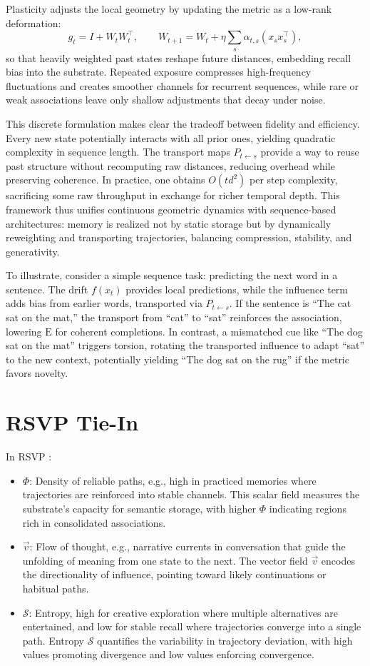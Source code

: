 \documentclass[a4paper,12pt]{article}
\newcommand{\E}{\mathrm{E}}
\newcommand{\Scal}{\mathcal{S}}
\newcommand{\vvec}{\vec{v}}
\begin{document}
Plasticity adjusts the local geometry by updating the metric as a low-rank deformation:
\[
g_t = I + W_t W_t^\top, \qquad W_{t+1} = W_t + \eta \sum_s \alpha_{t,s} (x_s x_s^\top),
\]
so that heavily weighted past states reshape future distances, embedding recall bias into the substrate. Repeated exposure compresses high-frequency fluctuations and creates smoother channels for recurrent sequences, while rare or weak associations leave only shallow adjustments that decay under noise.

This discrete formulation makes clear the tradeoff between fidelity and efficiency. Every new state potentially interacts with all prior ones, yielding quadratic complexity in sequence length. The transport maps $P_{t \leftarrow s}$ provide a way to reuse past structure without recomputing raw distances, reducing overhead while preserving coherence. In practice, one obtains $O(t d^2)$ per step complexity, sacrificing some raw throughput in exchange for richer temporal depth. This framework thus unifies continuous geometric dynamics with sequence-based architectures: memory is realized not by static storage but by dynamically reweighting and transporting trajectories, balancing compression, stability, and generativity.

To illustrate, consider a simple sequence task: predicting the next word in a sentence. The drift $f(x_t)$ provides local predictions, while the influence term adds bias from earlier words, transported via $P_{t \leftarrow s}$. If the sentence is ``The cat sat on the mat,'' the transport from ``cat'' to ``sat'' reinforces the association, lowering $\E$ for coherent completions. In contrast, a mismatched cue like ``The dog sat on the mat'' triggers torsion, rotating the transported influence to adapt ``sat'' to the new context, potentially yielding ``The dog sat on the rug'' if the metric favors novelty.

\section{RSVP Tie-In}
In RSVP \citep{semantic2025}:
\begin{itemize}
    \item $\Phi$: Density of reliable paths, e.g., high in practiced memories where trajectories 
    are reinforced into stable channels. This scalar field measures the substrate's capacity for 
    semantic storage, with higher $\Phi$ indicating regions rich in consolidated associations.
    \item $\vvec$: Flow of thought, e.g., narrative currents in conversation that guide 
    the unfolding of meaning from one state to the next. The vector field $\vvec$ encodes 
    the directionality of influence, pointing toward likely continuations or habitual paths.
    \item $\Scal$: Entropy, high for creative exploration where multiple alternatives are 
    entertained, and low for stable recall where trajectories converge into a single path. 
    Entropy $\Scal$ quantifies the variability in trajectory deviation, with high values 
    promoting divergence and low values enforcing convergence.
\end{itemize}
\end{document}
